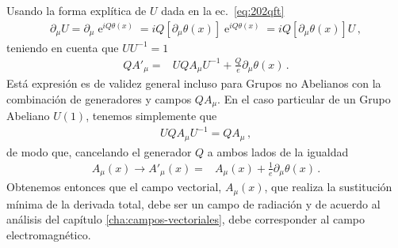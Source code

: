 \begin{frame}
Usando la forma explítica de $U$ dada en la ec.~\eqref{eq:202qft}
\begin{align}
  \partial_{\mu}U=  \partial_{\mu} \operatorname{e}^{iQ\theta(x)}=iQ \left[ \partial_{\mu}\theta(x) \right]\operatorname{e}^{iQ\theta(x)}
  =iQ \left[ \partial_{\mu}\theta(x) \right]U\,,
\end{align}
teniendo en cuenta que $U U^{-1}=1$
\begin{align}
  \label{eq:gnrlaggtr}
       QA'_{\mu} =& U QA_{\mu} U^{-1}+\frac{Q}{e}\partial_{\mu}\theta(x) \,.
\end{align}
Está expresión es de validez general incluso para Grupos no Abelianos con la combinación de generadores y campos $QA_{\mu}$. En el caso particular de un Grupo Abeliano  $U(1)$, tenemos simplemente que
\begin{align}
  UQA_{\mu}U^{-1}=QA_{\mu}\,,
\end{align}
de modo que, cancelando el generador $Q$ a ambos lados de la igualdad
\begin{align}
  \label{eq:radfielde}
  A_{\mu}(x)\to  A'_{\mu}(x)=&A_{\mu}(x)+\frac{1}{e}\partial_{\mu}\theta(x)\,.
\end{align}
Obtenemos entonces que el campo vectorial, $A_{\mu}(x)$, que realiza la sustitución mínima de la derivada total, debe ser un campo de radiación y de acuerdo al análisis del capítulo \ref{cha:campos-vectoriales}, debe corresponder al campo electromagnético.  


\end{frame}
